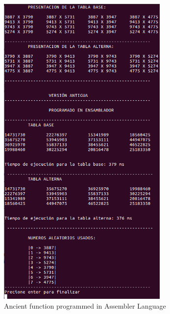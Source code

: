 \documentclass[legalpaper,12pt]{article}
\begin{document}
\begin{figure}[htbp]
  \centering
    \includegraphics[width=0.75\textwidth]{Antigua_E.png}
  \caption{Ancient function programmed in Assembler Language}
  \label{fig:antigua_e}
\end{figure}
\end{document}
